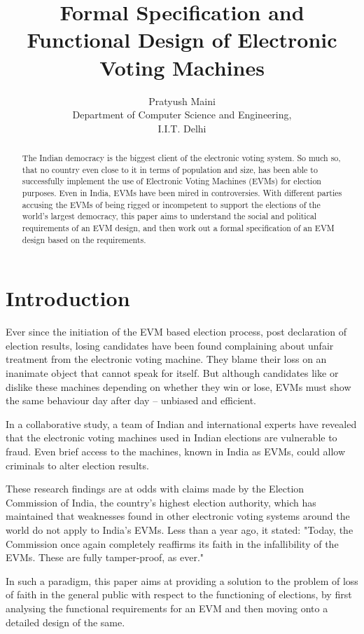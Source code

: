 \documentclass[a4paper,12pt]{extarticle}
\title{Formal Specification and Functional Design of Electronic Voting Machines}
\author{Pratyush Maini 
\\
Department of Computer Science and Engineering, 
\\
I.I.T. Delhi}
\begin{document}
\maketitle

\begin{abstract}
The Indian democracy is the biggest client of the electronic voting system. So much so, that no country even close to it in terms of population and size, has been able to successfully implement the use of Electronic Voting Machines (EVMs) for election purposes.
Even in India, EVMs have been mired in controversies. With different parties accusing the EVMs of being rigged or incompetent to support the elections of the world's largest democracy, this paper aims to understand the social and political requirements of an EVM design, and then work out a formal specification of an EVM design based on the requirements.

\end{abstract}

\section{Introduction}

Ever since the initiation of the EVM based election process, post declaration of election results, losing candidates have been found complaining about unfair treatment from the electronic voting machine. They blame their loss on an inanimate object that cannot speak for itself. But although candidates like or dislike these machines depending on whether they win or lose, EVMs must show the same behaviour day after day – unbiased and efficient.

In a collaborative study, a team of Indian and international experts have revealed that the electronic voting machines used in Indian elections are vulnerable to fraud. Even brief access to the machines, known in India as EVMs, could allow criminals to alter election results.

These research findings are at odds with claims made by the Election Commission of India, the country's highest election authority, which has maintained that weaknesses found in other electronic voting systems around the world do not apply to India's EVMs. Less than a year ago, it stated: "Today, the Commission once again completely reaffirms its faith in the infallibility of the EVMs. These are fully tamper-proof, as ever." 

In such a paradigm, this paper aims at providing a solution to the problem of loss of faith in the general public with respect to the functioning of elections, by first analysing the functional requirements for an EVM and then moving onto a detailed design of the same.
\end{document}
